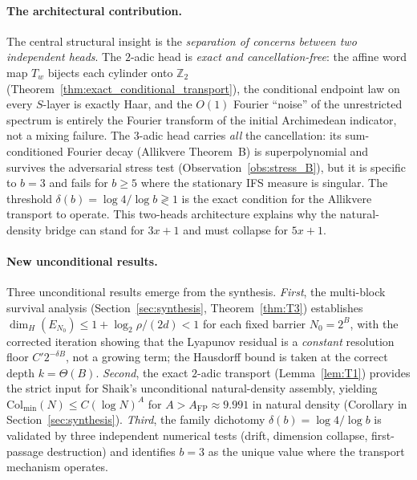 \documentclass[12pt,a4paper]{article}
\begin{document}
\paragraph{The architectural contribution.}
The central structural insight is the \emph{separation of concerns between two
independent heads}.  The $2$-adic head is \emph{exact and cancellation-free}:
the affine word map $T_w$ bijects each cylinder onto $\mathbb{Z}_2$
(Theorem~\ref{thm:exact_conditional_transport}), the conditional endpoint law
on every $S$-layer is exactly Haar, and the $O(1)$ Fourier ``noise'' of the
unrestricted spectrum is entirely the Fourier transform of the initial
Archimedean indicator, not a mixing failure.  The $3$-adic head carries
\emph{all} the cancellation: its sum-conditioned Fourier decay
(Allikvere Theorem~B) is superpolynomial and survives the adversarial stress
test (Observation~\ref{obs:stress_B}), but it is specific to $b=3$ and fails
for $b\ge5$ where the stationary IFS measure is singular.  The threshold
$\delta(b)=\log4/\log b\gtrless1$ is the exact condition for the
Allikvere transport to operate.  This two-heads architecture explains why the
natural-density bridge can stand for $3x+1$ and must collapse for $5x+1$.

\paragraph{New unconditional results.}
Three unconditional results emerge from the synthesis.
\emph{First}, the multi-block survival analysis
(Section~\ref{sec:synthesis}, Theorem~\ref{thm:T3}) establishes
$\dim_H(E_{N_0})\le1+\log_2\rho/(2d)<1$ for each fixed barrier $N_0=2^B$,
with the corrected iteration showing that the Lyapunov residual is a
\emph{constant} resolution floor $C'2^{-\delta B}$, not a growing term; the
Hausdorff bound is taken at the correct depth $k=\Theta(B)$.
\emph{Second}, the exact $2$-adic transport (Lemma~\ref{lem:T1}) provides the
strict input for Shaik's unconditional natural-density assembly, yielding
$\mathrm{Col}_{\min}(N)\le C(\log N)^A$ for $A>A_{\mathrm{FP}}\approx9.991$
in natural density (Corollary in Section~\ref{sec:synthesis}).
\emph{Third}, the family dichotomy $\delta(b)=\log4/\log b$ is validated by
three independent numerical tests (drift, dimension collapse, first-passage
destruction) and identifies $b=3$ as the unique value where the transport
mechanism operates.
\end{document}
